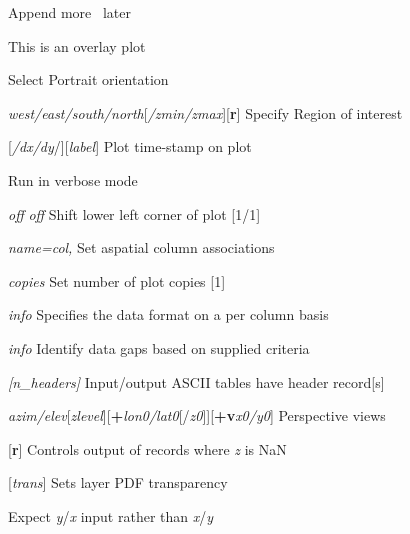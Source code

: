 \documentclass{article}
\begin{document}
\par {}	Append more \PS\ later\par 

\par {}	This is an overlay plot\par 

\par {}	Select Portrait orientation\par 

\par {}\emph{west/east/south/north}[\emph{/zmin/zmax}][\textbf{r}]	Specify Region of interest\par 

\par {}[\emph{/dx/dy}/][\emph{label}]	Plot time-stamp on plot\par 

\par {}	Run in verbose mode\par 

\par {}\emph{off} \emph{off}	Shift lower left corner of plot [1/1]\par 

\par {}\emph{name=col,}	Set aspatial column associations\par 

\par {}\emph{copies}	Set number of plot copies [1]\par 

\par {}\emph{info}	Specifies the data format on a per column basis  \par

\par {}\emph{info}	Identify data gaps based on supplied criteria  \par

\par {}\emph{[n\_headers]}	Input/output ASCII tables have header record[s]\par 

\par {}\emph{azim/elev}[\emph{zlevel}][\textbf{+}\emph{lon0/lat0}[/\emph{z0}]][\textbf{+v}\emph{x0/y0}]	Perspective views\par

\par {}[\textbf{r}]	Controls output of records where \emph{z} is NaN	\par

\par {}[\emph{trans}]	Sets layer PDF transparency  \par

\par \Opt{:}	Expect \emph{y}/\emph{x} input rather than \emph{x}/\emph{y}\par 
\end{document}
